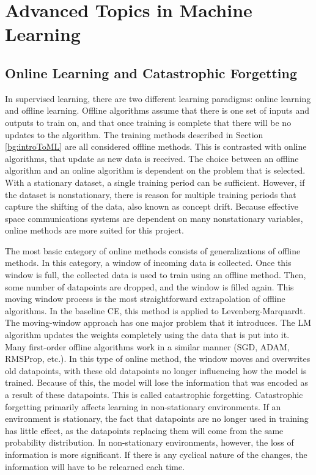 	\section{Advanced Topics in Machine Learning}
	\subsection{Online Learning and Catastrophic Forgetting}
	\par In supervised learning, there are two different learning paradigms: online learning and offline learning. Offline algorithms assume that there is one set of inputs and outputs to train on, and that once training is complete that there will be no updates to the algorithm. The training methods described in Section \ref{bg:introToML} are all considered offline methods. This is contrasted with online algorithms, that update as new data is received. The choice between an offline algorithm and an online algorithm is dependent on the problem that is selected. With a stationary dataset, a single training period can be sufficient. However, if the dataset is nonstationary, there is reason for multiple training periods that capture the shifting of the data, also known as concept drift. Because effective space communications systems are dependent on many nonstationary variables, online methods are more suited for this project.
	\par The most basic category of online methods consists of generalizations of offline methods. In this category, a window of incoming data is collected. Once this window is full, the collected data is used to train using an offline method. Then, some number of datapoints are dropped, and the window is filled again. This moving window process is the most straightforward extrapolation of offline algorithms. In the baseline CE, this method is applied to Levenberg-Marquardt. The moving-window approach has one major problem that it introduces. The LM algorithm updates the weights completely using the data that is put into it. Many first-order offline algorithms work in a similar manner (SGD, ADAM, RMSProp, etc.). In this type of online method, the window moves and overwrites old datapoints, with these old datapoints no longer influencing how the model is trained. Because of this, the model will lose the information that was encoded as a result of these datapoints. This is called catastrophic forgetting.  Catastrophic forgetting primarily affects learning in non-stationary environments. If an environment is stationary, the fact that datapoints are no longer used in training has little effect, as the datapoints replacing them will come from the same probability distribution. In non-stationary environments, however, the loss of information is more significant. If there is any cyclical nature of the changes, the information will have to be relearned each time.
